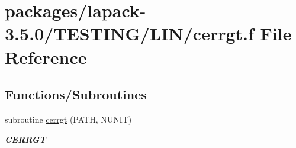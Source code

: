 \hypertarget{cerrgt_8f}{}\section{packages/lapack-\/3.5.0/\+T\+E\+S\+T\+I\+N\+G/\+L\+I\+N/cerrgt.f File Reference}
\label{cerrgt_8f}
\subsection*{Functions/\+Subroutines}
\begin{DoxyCompactItemize}
\item 
subroutine \hyperlink{group__complex__lin_gac5f296b97a6c26cee5a9b7b49c31f335}{cerrgt} (P\+A\+T\+H, N\+U\+N\+I\+T)
\begin{DoxyCompactList}\small\item\em {\bfseries C\+E\+R\+R\+G\+T} \end{DoxyCompactList}\end{DoxyCompactItemize}
